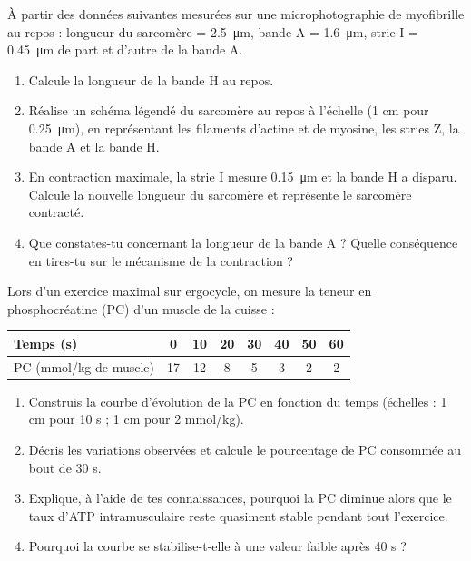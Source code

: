 \documentclass[11pt]{article}
\newcounter{popsec}
\newcounter{popsub}
\newcommand{\courssub}[1]{%
  \stepcounter{popsub}%
  \par\vspace{9pt}\noindent{\popxbold\fontsize{11.5}{13}\selectfont\color{popink}{\color{poporange}\thepopsec.\thepopsub}\hspace{6pt}#1}\par\nopagebreak\vspace{4pt}
}
\begin{document}
\courssub{Je m'entraîne}

\begin{exercice}
À partir des données suivantes mesurées sur une microphotographie de myofibrille au repos : longueur du sarcomère = \SI{2,5}{\micro m}, bande A = \SI{1,6}{\micro m}, strie I = \SI{0,45}{\micro m} de part et d'autre de la bande A.
\begin{enumerate}
\item Calcule la longueur de la bande H au repos.
\item Réalise un schéma légendé du sarcomère au repos à l'échelle (1 cm pour \SI{0,25}{\micro m}), en représentant les filaments d'actine et de myosine, les stries Z, la bande A et la bande H.
\item En contraction maximale, la strie I mesure \SI{0,15}{\micro m} et la bande H a disparu. Calcule la nouvelle longueur du sarcomère et représente le sarcomère contracté.
\item Que constates-tu concernant la longueur de la bande A ? Quelle conséquence en tires-tu sur le mécanisme de la contraction ?
\end{enumerate}
\end{exercice}

\begin{exercice}
Lors d'un exercice maximal sur ergocycle, on mesure la teneur en phosphocréatine (PC) d'un muscle de la cuisse :
\begin{center}
\begin{tabular}{|l|c|c|c|c|c|c|c|}
\hline
\rowcolor{popblueL} Temps (s) & 0 & 10 & 20 & 30 & 40 & 50 & 60 \\
\hline PC (mmol/kg de muscle) & 17 & 12 & 8 & 5 & 3 & 2 & 2 \\
\hline
\end{tabular}
\end{center}
\begin{enumerate}
\item Construis la courbe d'évolution de la PC en fonction du temps (échelles : 1 cm pour 10 s ; 1 cm pour 2 mmol/kg).
\item Décris les variations observées et calcule le pourcentage de PC consommée au bout de 30 s.
\item Explique, à l'aide de tes connaissances, pourquoi la PC diminue alors que le taux d'ATP intramusculaire reste quasiment stable pendant tout l'exercice.
\item Pourquoi la courbe se stabilise-t-elle à une valeur faible après 40 s ?
\end{enumerate}
\end{exercice}
\end{document}
